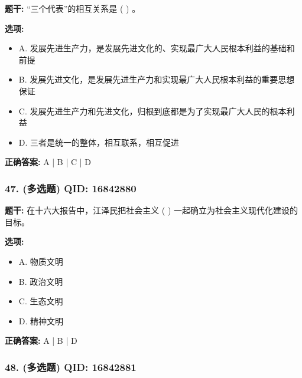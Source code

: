 \documentclass[12pt,UTF8]{ctexart}
\begin{document}
\textbf{题干:}
“三个代表”的相互关系是 ( ) 。

\textbf{选项:}
\begin{itemize}[leftmargin=*]

  \item A. 发展先进生产力，是发展先进文化的、实现最广大人民根本利益的基础和前提

  \item B. 发展先进文化，是发展先进生产力和实现最广大人民根本利益的重要思想保证

  \item C. 发展先进生产力和先进文化，归根到底都是为了实现最广大人民的根本利益

  \item D. 三者是统一的整体，相互联系，相互促进

\end{itemize}

\textbf{正确答案:}
A | B | C | D

\vspace{0.3em}\hrulefill\vspace{0.7em}

\subsubsection*{47. (多选题) \small QID: 16842880}

\textbf{题干:}
在十六大报告中，江泽民把社会主义 ( ) 一起确立为社会主义现代化建设的目标。

\textbf{选项:}
\begin{itemize}[leftmargin=*]

  \item A. 物质文明

  \item B. 政治文明

  \item C. 生态文明

  \item D. 精神文明

\end{itemize}

\textbf{正确答案:}
A | B | D

\vspace{0.3em}\hrulefill\vspace{0.7em}

\subsubsection*{48. (多选题) \small QID: 16842881}
\end{document}
